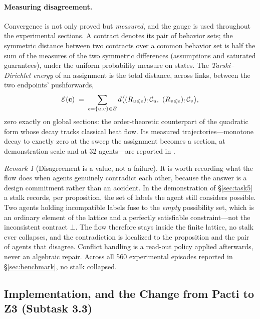 \documentclass[11pt]{article}
\newcommand{\face}{\trianglelefteqslant}
\theoremstyle{definition}
\theoremstyle{remark}
\newtheorem{remark}{Remark}
\begin{document}
\paragraph{Measuring disagreement.}
Convergence is not only proved but \emph{measured}, and the gauge is used throughout the
experimental sections.
A contract denotes its pair of behavior sets; the symmetric distance between two contracts over
a common behavior set is half the sum of the measures of the two symmetric differences
(assumptions and saturated guarantees), under the uniform probability measure on states.
The \emph{Tarski--Dirichlet energy} of an assignment is the total distance, across links,
between the two endpoints' pushforwards,
\begin{equation}
\label{eq:energy}
\mathcal{E}(\mathbf{c}) \;=\; \sum_{e = \{u,v\} \in E}
  d\bigl((R_{u \face e})_!\,\mathcal{C}_u,\ (R_{v \face e})_!\,\mathcal{C}_v\bigr),
\end{equation}
zero exactly on global sections: the order-theoretic counterpart of the quadratic form whose
decay tracks classical heat flow.
Its measured trajectories---monotone decay to exactly zero at the sweep the assignment becomes
a section, at demonstration scale and at 32 agents---are reported in .

\begin{remark}[Disagreement is a value, not a failure]
\label{rem:in-lattice}
It is worth recording what the flow does when agents genuinely contradict each other, because
the answer is a design commitment rather than an accident.
In the demonstration of \S\ref{sec:task5} a stalk records, per proposition, the set of labels
the agent still considers possible.
Two agents holding incompatible labels fuse to the \emph{empty} possibility set, which is an
ordinary element of the lattice and a perfectly satisfiable constraint---not the inconsistent
contract $\bot$.
The flow therefore stays inside the finite lattice, no stalk ever collapses, and the
contradiction is localized to the proposition and the pair of agents that disagree.
Conflict handling is a read-out policy applied afterwards, never an algebraic repair.
Across all 560 experimental episodes reported in \S\ref{sec:benchmark}, no stalk collapsed.
\end{remark}

\subsection{Implementation, and the Change from Pacti to Z3 (Subtask 3.3)}
\label{sec:z3}
\end{document}
